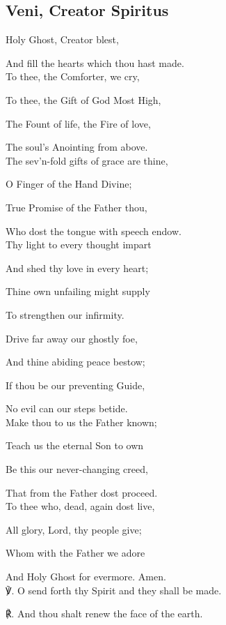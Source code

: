 \subsection{Veni, Creator Spiritus}
\begin{multicols}{2}
 Holy Ghost, Creator blest,\par
{}
And fill the hearts which thou hast made.\\

To thee, the Comforter, we cry,

To thee, the Gift of God Most High,

The Fount of life, the Fire of love,

The soul's Anointing from above.\\

The sev'n-fold gifts of grace are thine,

O Finger of the Hand Divine;

True Promise of the Father thou,

Who dost the tongue with speech endow.\\

Thy light to every thought impart

And shed thy love in every heart;

Thine own unfailing might supply

To strengthen our infirmity.%

\newcolumn

Drive far away our ghostly foe,

And thine abiding peace bestow;

If thou be our preventing Guide,

No evil can our steps betide.\\

Make thou to us the Father known;

Teach us the eternal Son to own

Be this our never-changing creed,

That from the Father dost proceed.\\

To thee who, dead, again dost live,

All glory, Lord, thy people give;

Whom with the Father we adore

And Holy Ghost for evermore. Amen.\\

℣. O send forth thy Spirit and they shall be made.\par
℟. And thou shalt renew the face of the earth.
\end{multicols}

